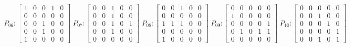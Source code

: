     $$
        P_{06} : \begin{bmatrix}
            1 & 0 & 0 & 1 & 0 \\
            0 & 0 & 0 & 0 & 0 \\
            0 & 0 & 1 & 0 & 0 \\
            0 & 0 & 1 & 0 & 0 \\
            1 & 0 & 0 & 0 & 0
        \end{bmatrix}
        \;
         P_{07} : \begin{bmatrix}
            0 & 0 & 1 & 0 & 0 \\
            0 & 0 & 1 & 0 & 0 \\
            0 & 0 & 1 & 0 & 1 \\
            0 & 0 & 1 & 0 & 0 \\
            0 & 0 & 0 & 0 & 0
        \end{bmatrix}
        \;
        P_{08} : \begin{bmatrix}
            0 & 0 & 1 & 0 & 0 \\
            0 & 0 & 0 & 0 & 0 \\
            1 & 1 & 1 & 0 & 0 \\
            0 & 0 & 0 & 0 & 0 \\
            1 & 0 & 0 & 0 & 0
        \end{bmatrix}
        \;
        P_{09} : \begin{bmatrix}
            0 & 0 & 0 & 0 & 0 \\
            1 & 0 & 0 & 0 & 0 \\
            0 & 0 & 0 & 0 & 1 \\
            0 & 1 & 0 & 1 & 1 \\
            0 & 0 & 0 & 0 & 0
        \end{bmatrix}
        \;
        P_{10} : \begin{bmatrix}
            0 & 0 & 0 & 0 & 0 \\
            0 & 0 & 1 & 0 & 0 \\
            0 & 0 & 0 & 1 & 0 \\
            0 & 0 & 0 & 0 & 1 \\
            0 & 0 & 1 & 0 & 1
        \end{bmatrix}
    $$

